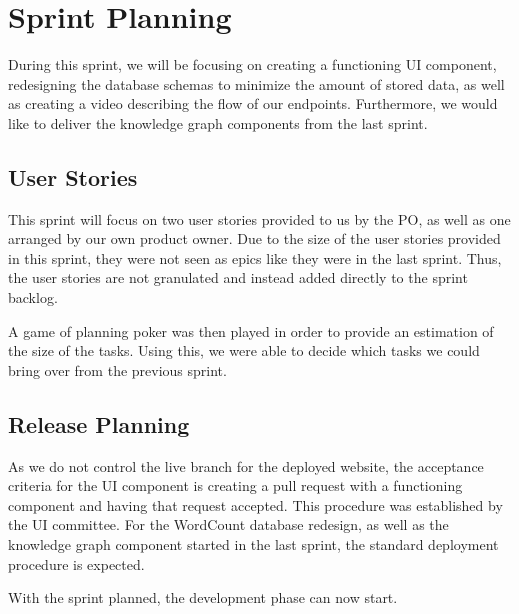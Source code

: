 \section{Sprint Planning}
During this sprint, we will be focusing on creating a functioning UI component, redesigning the database schemas to minimize the amount of stored data, as well as creating a video describing the flow of our endpoints. Furthermore, we would like to deliver the knowledge graph components from the last sprint. 

\subsection*{User Stories}
This sprint will focus on two user stories provided to us by the \knox{} PO, as well as one arranged by our own product owner. 
Due to the size of the user stories provided in this sprint, they were not seen as epics like they were in the last sprint. Thus, the user stories are not granulated and instead added directly to the sprint backlog.  


A game of planning poker was then played in order to provide an estimation of the size of the tasks. 
Using this, we were able to decide which tasks we could bring over from the previous sprint.

\subsection*{Release Planning}
As we do not control the live branch for the deployed \knox{} website, the acceptance criteria for the UI component is creating a pull request with a functioning component and having that request accepted.
This procedure was established by the UI committee. 
For the WordCount database redesign, as well as the knowledge graph component started in the last sprint, the standard deployment procedure is expected. 

With the sprint planned, the development phase can now start.
